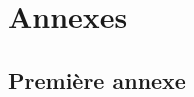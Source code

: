 \chapter*{Annexes}
\makeatletter\renewcommand{}\makeatother

\makeatletter\renewcommand{\thefigure}{\thesection-\@arabic\c@figure}\makeatother
\makeatletter\renewcommand{\theequation}{\thesection-\@arabic\c@equation}\makeatother

\section{Première annexe}
\lipsum[1-2]